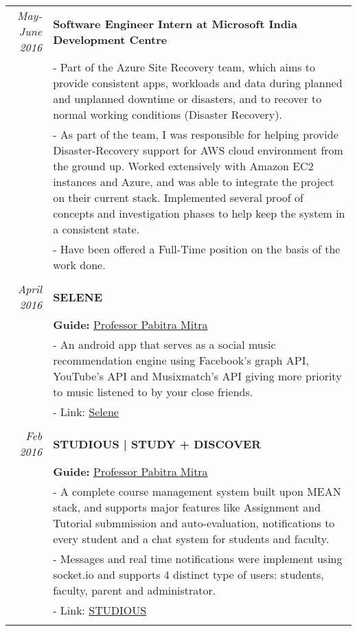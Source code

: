 \documentclass[a4paper,10pt]{article} %
\begin{document}
\begin{tabular}{r|p{15cm}}

\emph{May-June 2016} & \textbf{Software Engineer Intern at Microsoft India Development Centre}\\
& \footnotesize{- Part of the Azure Site Recovery team, which aims to provide consistent apps, workloads and data during planned and unplanned downtime or disasters, and to recover to normal working conditions (Disaster Recovery). }\\
& \footnotesize{- As part of the team, I was responsible for helping provide Disaster-Recovery support for AWS cloud environment from the ground up. Worked extensively with Amazon EC2 instances and Azure, and was able to integrate the project on their current stack. Implemented several proof of concepts and investigation phases to help keep the system in a consistent state.}\\
& \footnotesize{- Have been offered a Full-Time position on the basis of the work done. }\\
\multicolumn{2}{c}{} \\

\emph{April 2016} & \textbf{SELENE}\\
& \textbf{Guide: }\textmd{\href{http://cse.iitkgp.ac.in/~pabitra/}{Professor Pabitra Mitra}}\\
& \footnotesize{- An android app that serves as a social music recommendation engine using Facebook's graph API, YouTube's API and Musixmatch's API giving more priority to music listened to by your close friends.}\\
& \footnotesize{- Link: \href{http://ghostwriternr.me/Selene/}{Selene}}\\
\multicolumn{2}{c}{} \\

\emph{Feb 2016} & \textbf{STUDIOUS | STUDY + DISCOVER }\\
& \textbf{Guide: }\textmd{\href{http://cse.iitkgp.ac.in/~pabitra/}{Professor Pabitra Mitra}}\\
& \footnotesize{- A complete course management system built upon MEAN stack, and supports major features like Assignment and Tutorial submmission and auto-evaluation, notifications to every student and a chat system for students and faculty.}\\
& \footnotesize{- Messages and real time notifications were implement using socket.io and supports 4 distinct type of users: students, faculty, parent and administrator.
}\\
& \footnotesize{- Link: \href{https://github.com/ghostwriternr/dbmsass3}{STUDIOUS}}\\
\multicolumn{2}{c}{} \\


\end{tabular}
\end{document}
